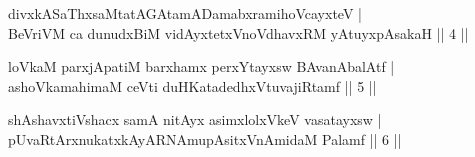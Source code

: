 \begin{shl}
divxkASaThxsaMtatAGAtamADamabxramihoVcayxteV | \\
BeVriVM ca dunudxBiM vidAyxtetxVnoVdhavxRM yAtuyxpAsakaH \hfill ||  4 || 
\end{shl}

\begin{shl}
loVkaM parxjApatiM barxhamx perxYtayxsw BAvanAbalAtf | \\
ashoVkamahimaM ceVti duHKatadedhxVtuvajiRtamf \hfill ||  5 || 
\end{shl}

\begin{shl}
shAshavxtiVshacx samA nitAyx asimxlolxVkeV vasatayxsw  | \\
pUvaRtArxnukatxkAyARNAmupAsitxVnAmidaM Palamf \hfill ||  6 || 
\end{shl}

